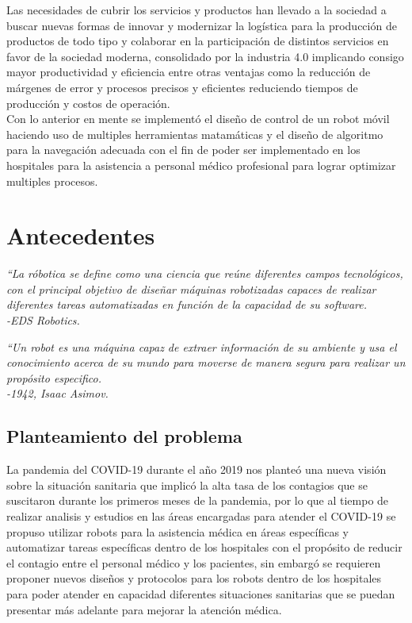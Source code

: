 \documentclass[12pt]{book} %
\begin{document}
\setcounter{page}{1}

Las necesidades de cubrir los servicios y productos han llevado a la sociedad a buscar nuevas formas de innovar y modernizar la logística para la producción de productos de todo tipo y colaborar en la participación de distintos servicios en favor de la sociedad moderna, consolidado por la industria 4.0 implicando consigo mayor productividad y eficiencia entre otras ventajas como la reducción de márgenes de error y procesos precisos y eficientes reduciendo tiempos de producción y costos de operación.
\\
Con lo anterior en mente se implementó el diseño de control de un robot móvil haciendo uso de multiples herramientas matamáticas y el diseño de algoritmo para la navegación adecuada con el fin de poder ser implementado en los hospitales para la asistencia a personal médico profesional para lograr optimizar multiples procesos.

\chapter{Antecedentes}
\begin{flushright}
\textit{“La róbotica se define como una ciencia que reúne diferentes campos tecnológicos, con el principal objetivo de diseñar máquinas robotizadas capaces de realizar diferentes tareas automatizadas en función de la capacidad de su software.
\\[0.1cm]
-EDS Robotics.}
\end{flushright}

\begin{flushright}
\textit{“Un robot es una máquina capaz de extraer información de su ambiente y usa el conocimiento acerca de su mundo para moverse de manera segura para realizar un propósito especifico.
\\[0.1cm]
-1942, Isaac Asimov.}
\end{flushright}
	\section{Planteamiento del problema }
La pandemia del COVID-19 durante el año 2019 nos planteó una nueva visión sobre la situación sanitaria que implicó la alta tasa de los contagios que se suscitaron durante los primeros meses de la pandemia, por lo que al tiempo de realizar analisis y estudios en las áreas encargadas para atender el COVID-19 se propuso utilizar robots para la asistencia médica en áreas específicas y automatizar tareas específicas dentro de los hospitales con el propósito de reducir el contagio entre el personal médico y los pacientes, sin embargó se requieren proponer nuevos diseños y protocolos para los robots dentro de los hospitales para poder atender en capacidad diferentes situaciones sanitarias que se puedan presentar más adelante para mejorar la atención médica.
\newpage
\end{document}
